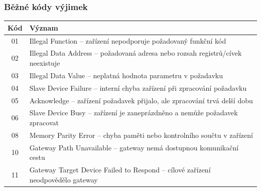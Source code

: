 	\begin{frame}
    \frametitle{Běžné kódy výjimek}
		
		\small
		\begin{tabular}{|c|p{10cm}|}
			\hline
			\textbf{Kód} & \textbf{Význam} \\ \hline

			01 & Illegal Function -- zařízení nepodporuje požadovaný funkční kód \\ \hline

			02 & Illegal Data Address -- požadovaná adresa nebo rozsah registrů/cívek neexistuje \\ \hline

			03 & Illegal Data Value -- neplatná hodnota parametru v požadavku \\ \hline

			04 & Slave Device Failure -- interní chyba zařízení při zpracování požadavku \\ \hline

			05 & Acknowledge -- zařízení požadavek přijalo, ale zpracování trvá delší dobu \\ \hline

			06 & Slave Device Busy -- zařízení je zaneprázdněno a nemůže požadavek zpracovat \\ \hline

			08 & Memory Parity Error -- chyba paměti nebo kontrolního součtu v zařízení \\ \hline

			10 & Gateway Path Unavailable -- gateway nemá dostupnou komunikační cestu \\ \hline

			11 & Gateway Target Device Failed to Respond -- cílové zařízení neodpovědělo gateway \\ \hline

		\end{tabular}
		
	\end{frame}
	
